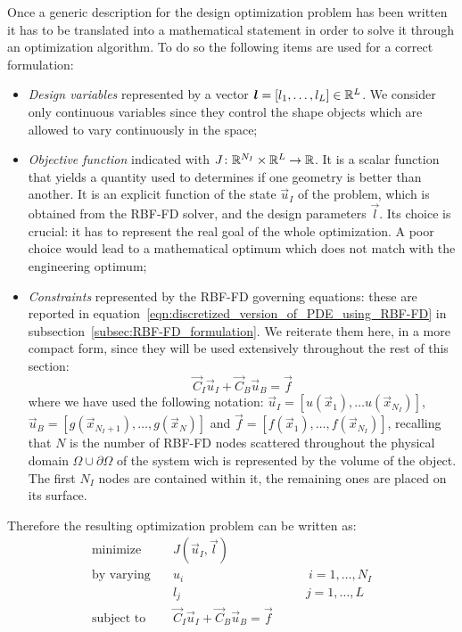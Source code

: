 Once a generic description for the design optimization problem has been written it has to be translated into a mathematical statement in order to solve it through an optimization algorithm. To do so the following items are used for a correct formulation:
\begin{itemize}
	\item \emph{Design variables} represented by a vector $\boldsymbol{l} = \left[ l_1, \dots, l_L \right] \in \mathbb{R}^L$. We consider only continuous variables since they control the shape objects which are allowed to vary continuously in the space;
	
	\item \emph{Objective function} indicated with $J \colon \mathbb{R}^{N_I}\times\mathbb{R}^L \to \mathbb{R}$. It is a scalar function that yields a quantity used to determines if one geometry is better than another. It is an explicit function of the state $\vec{u}_I$ of the problem, which is obtained from the RBF-FD solver, and the design parameters $\vec{l}$. Its choice is crucial: it has to represent the real goal of the whole optimization. A poor choice would lead to a mathematical optimum which does not match with the engineering optimum;
	\item \emph{Constraints} represented by the RBF-FD governing equations: these are reported in equation~\eqref{eqn:discretized_version_of_PDE_using_RBF-FD} in subsection~\vref{subsec:RBF-FD_formulation}. We reiterate them here, in a more compact form, since they will be used extensively throughout the rest of this section:
	\begin{equation}
		\label{eqn:compact_discretized_PDE}
		\vec{C}_I \vec{u}_I + \vec{C}_B \vec{u}_B = \vec{f}
	\end{equation}
	where we have used the following notation: $\vec{u}_I = \left[ u(\vec{x}_1), \dots u(\vec{x}_{N_I}) \right]$, $\vec{u}_B = \left[ g(\vec{x}_{N_I+1}), \dots, g(\vec{x}_N) \right]$ and $\vec{f} = \left[ f(\vec{x}_1), \dots, f(\vec{x}_{N_I}) \right]$, recalling that $N$ is the number of RBF-FD nodes scattered throughout the physical domain $\Omega\cup\partial\Omega$ of the system wich is represented by the volume of the object. The first $N_I$ nodes are contained within it, the remaining ones are placed on its surface.
\end{itemize}
Therefore the resulting optimization problem can be written as:
\begin{equation}
	\label{eqn:RBF-FD_opt_problem}
	\begin{aligned}
		\text{minimize} & \quad J(\vec{u}_I, \vec{l})	\\
		\text{by varying} & \quad u_i \qquad\qquad\qquad\qquad\qquad i=1, \dots, N_I	\\
						& \quad l_j \qquad\qquad\qquad\qquad\qquad j=1, \dots, L	\\
		\text{subject to} & \quad \vec{C}_I \vec{u}_I + \vec{C}_B \vec{u}_B = \vec{f}					
	\end{aligned}
\end{equation}
